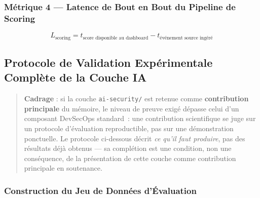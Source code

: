 \subsubsection{Métrique 4 — Latence de Bout en Bout du Pipeline de Scoring}
\begin{equation}
L_{\text{scoring}} = t_{\text{score disponible au dashboard}} - t_{\text{événement source ingéré}}
\end{equation}

\subsection{Protocole de Validation Expérimentale Complète de la Couche IA}
\label{sec:validation_experimentale_ia}

\begin{quote}
\textbf{Cadrage} : si la couche \texttt{ai-security/} est retenue comme \textbf{contribution principale} du mémoire, le niveau de preuve exigé dépasse celui d'un composant DevSecOps standard~: une contribution scientifique se juge sur un protocole d'évaluation reproductible, pas sur une démonstration ponctuelle. Le protocole ci-dessous décrit \emph{ce qu'il faut produire}, pas des résultats déjà obtenus — sa complétion est une condition, non une conséquence, de la présentation de cette couche comme contribution principale en soutenance.
\end{quote}

\subsubsection{Construction du Jeu de Données d'Évaluation}

